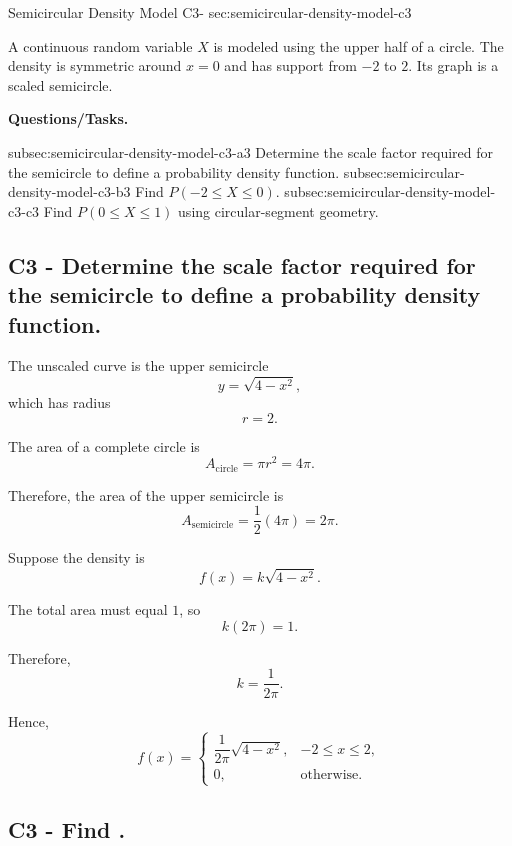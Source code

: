 	\sectionScored
	{Semicircular Density Model}
	{C3-}
	{sec:semicircular-density-model-c3}
	{
	A continuous random variable $X$ is modeled using the upper half of a circle. The density is symmetric around $x=0$ and has support from $-2$ to $2$. Its graph is a scaled semicircle.
	
	\textbf{Questions/Tasks.}
	\begin{enumerate}
		\CriterionTask
		{subsec:semicircular-density-model-c3-a}{3}
		{Determine the scale factor required for the semicircle to define a probability density function. }
		\CriterionTask
		{subsec:semicircular-density-model-c3-b}{3}
		{Find $P(-2\le X\le0)$. }
		\CriterionTask
		{subsec:semicircular-density-model-c3-c}{3}
		{Find $P(0\le X\le1)$ using circular-segment geometry. }
	\end{enumerate}
	
	\label{subsec:semicircular-density-model-c3-a}
	\subsection*{C3 - Determine the scale factor required for the semicircle to define a probability density function. }
	
	The unscaled curve is the upper semicircle
	\[
	y=\sqrt{4-x^2},
	\]
	which has radius
	\[
	r=2.
	\]
	
	The area of a complete circle is
	\[
	A_{\text{circle}}=\pi r^2=4\pi.
	\]
	
	Therefore, the area of the upper semicircle is
	\[
	A_{\text{semicircle}}
	=\frac{1}{2}(4\pi)
	=2\pi.
	\]
	
	Suppose the density is
	\[
	f(x)=k\sqrt{4-x^2}.
	\]
	
	The total area must equal $1$, so
	\[
	k(2\pi)=1.
	\]
	
	Therefore,
	\[
	k=\frac{1}{2\pi}.
	\]
	
	Hence,
	\[
	f(x)=
	\begin{cases}
		\dfrac{1}{2\pi}\sqrt{4-x^2}, & -2\le x\le2,\\[6pt]
		0, & \text{otherwise.}
	\end{cases}
	\]
	

	\label{subsec:semicircular-density-model-c3-b}
	\subsection*{C3 - Find . }
	
}
